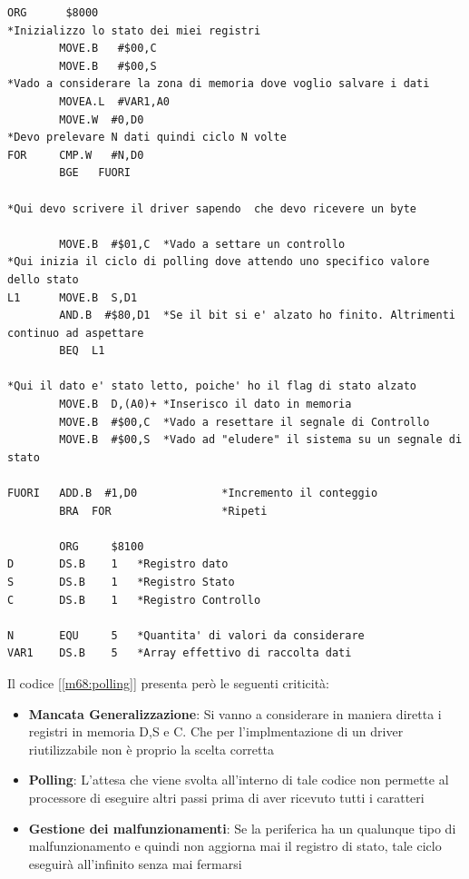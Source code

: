 \begin{lstlisting}[caption={Codice polling}, label=m68:polling]
        ORG      $8000
*Inizializzo lo stato dei miei registri
        MOVE.B   #$00,C
        MOVE.B   #$00,S
*Vado a considerare la zona di memoria dove voglio salvare i dati
        MOVEA.L  #VAR1,A0
        MOVE.W  #0,D0
*Devo prelevare N dati quindi ciclo N volte
FOR     CMP.W   #N,D0
        BGE   FUORI

*Qui devo scrivere il driver sapendo  che devo ricevere un byte

        MOVE.B  #$01,C  *Vado a settare un controllo
*Qui inizia il ciclo di polling dove attendo uno specifico valore dello stato
L1      MOVE.B  S,D1
        AND.B  #$80,D1  *Se il bit si e' alzato ho finito. Altrimenti continuo ad aspettare
        BEQ  L1

*Qui il dato e' stato letto, poiche' ho il flag di stato alzato
        MOVE.B  D,(A0)+ *Inserisco il dato in memoria
        MOVE.B  #$00,C  *Vado a resettare il segnale di Controllo
        MOVE.B  #$00,S  *Vado ad "eludere" il sistema su un segnale di stato

FUORI   ADD.B  #1,D0             *Incremento il conteggio
        BRA  FOR                 *Ripeti

        ORG     $8100
D       DS.B    1   *Registro dato
S       DS.B    1   *Registro Stato
C       DS.B    1   *Registro Controllo

N       EQU     5   *Quantita' di valori da considerare
VAR1    DS.B    5   *Array effettivo di raccolta dati
\end{lstlisting}
\newpage
Il codice [\ref{m68:polling}] presenta però le seguenti criticità:
\begin{itemize}
    \item \textbf{Mancata Generalizzazione}: Si vanno a considerare in maniera diretta i registri in memoria D,S e C. Che per l'implmentazione di un driver riutilizzabile non è proprio la scelta corretta
    \item \textbf{Polling}: L'attesa che viene svolta all'interno di tale codice non permette al processore di eseguire altri passi prima di aver ricevuto tutti i caratteri
    \item \textbf{Gestione dei malfunzionamenti}: Se la periferica ha un qualunque tipo di malfunzionamento e quindi non aggiorna mai il registro di stato, tale ciclo eseguirà all'infinito senza mai fermarsi
\end{itemize}

